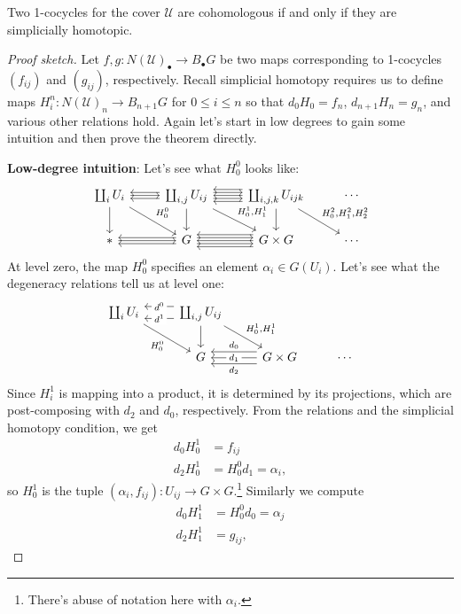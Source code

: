 \documentclass[11pt,openany]{book}
\def\theshiftamount{2}
\begin{document}
\begin{theorem} Two 1-cocycles for the cover $\mathcal{U}$ are cohomologous if and only if they are simplicially homotopic.
\end{theorem}
\begin{proof}[Proof sketch] Let $f,g \colon N(\mathcal{U})_\bullet \to B_\bullet G$ be two maps corresponding to 1-cocycles $(f_{ij})$ and $(g_{ij})$, respectively. Recall simplicial homotopy requires us to define maps $H^n_i \colon N(\mathcal{U})_n \to B_{n+1}G$ for $0\le i\le n$ so that $d_0 H_0 = f_n$, $d_{n+1} H_n = g_n$, and various other relations hold. Again let's start in low degrees to gain some intuition and then prove the theorem directly.

\textbf{Low-degree intuition}: Let's see what $H_0^0$ looks like:
\def\theshiftamount{1}
\[ \begin{tikzcd}
    {\coprod_i U_i}\rar\dar\ar[dr,"H^0_0" above right] & {\coprod_{i,j}U_{ij}} \lar[shift left=\theshiftamount]\lar[shift right=\theshiftamount]\rar[shift left=\theshiftamount]\rar[shift right=\theshiftamount]\dar\ar[dr,"{H^1_0,H^1_1}" above right] & \coprod_{i,j,k} U_{ijk} \lar \lar[shift left=2*\theshiftamount]\lar[shift right=2*\theshiftamount]\dar\ar[dr,"{H_0^2,H_1^2,H_2^2}" above right] & \cdots \\
    \ast\rar & G \lar[shift left=\theshiftamount]\lar[shift right=\theshiftamount]\rar[shift left=\theshiftamount]\rar[shift right=\theshiftamount] & G \times G \lar \lar[shift left=2*\theshiftamount]\lar[shift right=2*\theshiftamount] & \cdots 
\end{tikzcd} \]
\def\theshiftamount{2}
At level zero, the map $H^0_0$ specifies an element $\alpha_i \in G(U_i)$. Let's see what the degeneracy relations tell us at level one:
\[ \begin{tikzcd}
    {\coprod_i U_i}\ar[dr,"H^0_0" below left] & {\coprod_{i,j}U_{ij}} \lar[shift left=\theshiftamount,"d^1" description]\lar[shift right=\theshiftamount,"d^0" description]\dar\ar[dr,"{H^1_0,H^1_1}" above right] &  \\
     & G & G \times G \lar["d_1" description] \lar[shift left=\theshiftamount,"d_2" below]\lar[shift right=\theshiftamount,"d_0" above] & \cdots 
\end{tikzcd} \]
Since $H_i^1$ is mapping into a product, it is determined by its projections, which are post-composing with $d_2$ and $d_0$, respectively. From the relations and the simplicial homotopy condition, we get
\begin{align*}
    d_0 H_0^1 &= f_{ij} \\
    d_2 H_0^1 &= H_0^0 d_1 = \alpha_i,
\end{align*}
so $H_0^1$ is the tuple $(\alpha_i,f_{ij}) \colon U_{ij} \to G \times G$.\footnote{There's abuse of notation here with $\alpha_i$.} Similarly we compute
\begin{align*}
    d_0 H_1^1 &= H_0^0 d_0 = \alpha_j \\
    d_2 H_1^1 &= g_{ij},
\end{align*}
 

\end{proof}
\end{document}
